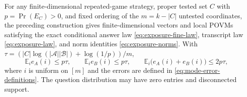 \begin{lemma}\label{lem:exposure}
For any finite-dimensional repeated-game strategy, proper tested set
$C$ with $p=\Pr(E_C)>0$, and fixed ordering of the $m=k-|C|$ untested
coordinates, the preceding construction gives finite-dimensional vectors
and local POVMs satisfying the exact conditional answer law
\eqref{eq:exposure-fine-law}, transcript law \eqref{eq:exposure-law},
and norm identities \eqref{eq:exposure-norms}. With
$\tau=(|C|\log(|\mathcal A||\mathcal B|)+\log(1/p))/m$,
\begin{equation}\label{eq:exposure-errors}
 \mathbb E_i e_A(i)\le p\tau,\qquad
 \mathbb E_i e_B(i)\le p\tau,\qquad
 \mathbb E_i\bigl(e_A(i)+e_B(i)\bigr)\le2p\tau,
\end{equation}
where $i$ is uniform on $[m]$ and the errors are defined in
\eqref{eq:mode-error-definitions}. The question distribution may have
zero entries and disconnected support.
\end{lemma}

